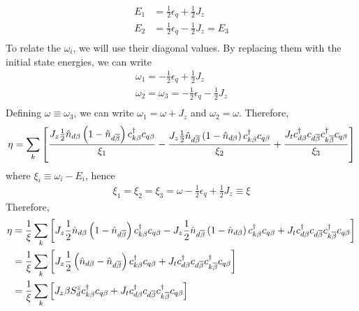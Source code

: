 \documentclass[12pt,twoside]{article}
\numberwithin{equation}{section}
\begin{document}
\begin{equation}\begin{aligned}
	E_1 &= \frac{1}{2}\epsilon_q + \frac{1}{2}J_z\\
	E_2 &= \frac{1}{2}\epsilon_q - \frac{1}{2}J_z = E_3\\
\end{aligned}\end{equation}
To relate the \(\omega_i\), we will use their diagonal values. By replacing them with the initial state energies, we can write
\begin{equation}\begin{aligned}
	\omega_1 = - \frac{1}{2}\epsilon_q + \frac{1}{2}J_z\\
	\omega_2 = \omega_3 = - \frac{1}{2}\epsilon_q - \frac{1}{2}J_z\\
\end{aligned}\end{equation}
Defining \(\omega \equiv \omega_3\), we can write \(\omega_1 = \omega + J_z\) and \(\omega_2 = \omega\). Therefore,
\begin{equation}\begin{aligned}
	\eta = \sum_k \left[\frac{ J_z \frac{1}{2}\hat n_{d\beta}\left( 1 - \hat n_{d\overline\beta} \right) c^\dagger_{k\beta}c_{q\beta}}{\xi_1} - \frac{J_z \frac{1}{2}\hat n_{d\overline\beta}\left( 1 - \hat n_{d\beta} \right) c^\dagger_{k\beta}c_{q\beta}}{\xi_2} + \frac{J_t  c^\dagger_{d\beta}c_{d\overline\beta} c^\dagger_{k\overline\beta}c_{q\beta}}{\xi_3}\right] 
\end{aligned}\end{equation}
where \(\xi_i \equiv \omega_i - E_i\), hence
\begin{equation}\begin{aligned}
	\xi_1 = \xi_2 = \xi_3 = \omega - \frac{1}{2}\epsilon_q + \frac{1}{2}J_z \equiv \xi
\end{aligned}\end{equation}
Therefore,
\begin{equation}\begin{aligned}
	\eta &= \frac{1}{\xi}\sum_k \left[ J_z \frac{1}{2}\hat n_{d\beta}\left( 1 - \hat n_{d\overline\beta} \right) c^\dagger_{k\beta}c_{q\beta} - J_z \frac{1}{2}\hat n_{d\overline\beta}\left( 1 - \hat n_{d\beta} \right) c^\dagger_{k\beta}c_{q\beta} + J_t  c^\dagger_{d\beta}c_{d\overline\beta} c^\dagger_{k\overline\beta}c_{q\beta}\right] \\
	     &= \frac{1}{\xi}\sum_k \left[ J_z \frac{1}{2}\left(\hat n_{d\beta} - \hat n_{d\overline\beta}\right) c^\dagger_{k\beta}c_{q\beta} + J_t  c^\dagger_{d\beta}c_{d\overline\beta} c^\dagger_{k\overline\beta}c_{q\beta}\right]\\
	     &= \frac{1}{\xi}\sum_k \left[ J_z \beta S_d^z c^\dagger_{k\beta}c_{q\beta} + J_t  c^\dagger_{d\beta}c_{d\overline\beta} c^\dagger_{k\overline\beta}c_{q\beta}\right]
\end{aligned}\end{equation}
\end{document}
